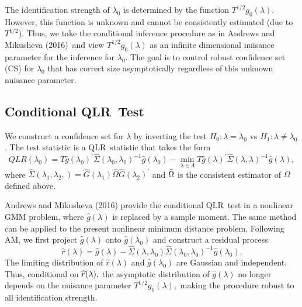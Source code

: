 \documentclass[11pt, letterpaper, twoside]{article}
\begin{document}
The identification strength of $\lambda _{0}$ is determined by the function $%
T^{1/2}g_{0}(\lambda ).$ However, this function is unknown and cannot be
consistently estimated (due to $T^{1/2}$). Thus, we take the conditional
inference procedure as in Andrews and Mikusheva (2016)\ and view $%
T^{1/2}g_{0}(\lambda )$ as an infinite dimensional nuisance parameter for
the inference for $\lambda _{0}$. The goal is to control robust confidence
set (CS) for $\lambda _{0}$ that has correct size asymptotically regardless
of this unknown nuisance parameter.

\subsection{Conditional QLR\ Test}

We construct a confidence set for $\lambda $ by inverting the test $%
H_{0}:\lambda =\lambda _{0}$ vs $H_{1}:\lambda \neq \lambda _{0}$. The test
statistic is a QLR\ statistic that takes the form%
\begin{equation}
QLR(\lambda _{0})=T\widehat{g}(\lambda _{0})^{\prime }\widehat{\Sigma }%
(\lambda _{0},\lambda _{0})^{-1}\widehat{g}(\lambda _{0})-\underset{\lambda
\in \Lambda }{\min }T\widehat{g}(\lambda )^{\prime }\widehat{\Sigma }%
(\lambda ,\lambda )^{-1}\widehat{g}(\lambda ),  \label{QLR stat}
\end{equation}%
where $\widehat{\Sigma }(\lambda _{1},\lambda _{2},)=\widehat{G}(\lambda
_{1})\widehat{\Omega }\widehat{G}(\lambda _{2})^{\prime }$ and $\widehat{%
\Omega }$ is the consistent estimator of $\Omega $ defined above$.$

Andrews and Mikusheva (2016) provide the conditional QLR\ test in a
nonlinear GMM problem, where $\widehat{g}(\lambda )$ is replaced by a sample
moment. The same method can be applied to the present nonlinear minimum
distance problem. Following AM, we first project $\widehat{g}(\lambda )$
onto $\widehat{g}(\lambda _{0})$ and construct a residual process%
\begin{equation}
\widehat{r}(\lambda )=\widehat{g}(\lambda )-\widehat{\Sigma }(\lambda
,\lambda _{0})\widehat{\Sigma }(\lambda _{0},\lambda _{0})^{-1}\widehat{g}%
(\lambda _{0}).  \label{red process}
\end{equation}%
The limiting distribution of $\widehat{r}(\lambda )$ and $\widehat{g}%
(\lambda _{0})$ are Gaussian and independent. Thus, conditional on $\widehat{%
r}(\lambda ),$ the asymptotic distribution of $\widehat{g}(\lambda )$ no
longer depends on the nuisance parameter $T^{1/2}g_{0}(\lambda ),$ making
the procedure robust to all identification strength.
\end{document}
